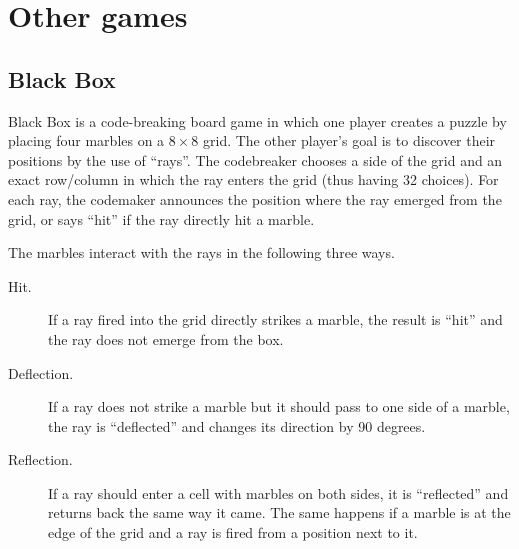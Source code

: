 \section{Other games}
\subsection{Black Box}

Black Box is a code-breaking board game in which one player creates a
  puzzle by placing four marbles on a $8\times 8$ grid.
The other player's goal is to discover their positions
  by the use of ``rays''.
The codebreaker chooses a side of the grid and an exact row/column in which
  the ray enters the grid (thus having 32 choices).
For each ray, the codemaker announces the position where the ray emerged from the grid,
  or says ``hit'' if the ray directly hit a marble\cite{blackbox}.

The marbles interact with the rays in the following three ways.
\begin{description}
\item[Hit.] If a ray fired into the grid directly strikes a marble,
  the result is ``hit'' and the ray does not emerge from the box.
\item[Deflection.] If a ray does not strike a marble
  but it should pass to one side of a marble, the ray is
  ``deflected'' and changes its direction by 90 degrees.
\item[Reflection.] If a ray should enter a cell with marbles on both sides,
  it is ``reflected'' and returns back the same way it came.
  The same happens if a marble is at the edge of the grid
  and a ray is fired from a position next to it.
\end{description}

